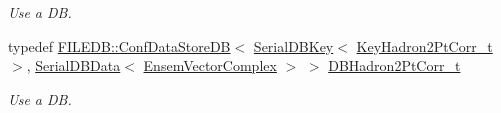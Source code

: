 \begin{DoxyCompactItemize}
\begin{DoxyCompactList}\small\item\em Use a DB. \end{DoxyCompactList}\item 
typedef \mbox{\hyperlink{classFILEDB_1_1ConfDataStoreDB}{F\+I\+L\+E\+D\+B\+::\+Conf\+Data\+Store\+DB}}$<$ \mbox{\hyperlink{classADATIO_1_1SerialDBKey}{Serial\+D\+B\+Key}}$<$ \mbox{\hyperlink{structFF_1_1KeyHadron2PtCorr__t}{Key\+Hadron2\+Pt\+Corr\+\_\+t}} $>$, \mbox{\hyperlink{classADATIO_1_1SerialDBData}{Serial\+D\+B\+Data}}$<$ \mbox{\hyperlink{group__defs_ga13b984332760feb8bc9c8f1071ade9ef}{Ensem\+Vector\+Complex}} $>$ $>$ \mbox{\hyperlink{namespaceFF_a01cd8ed6e36964833ba6609588a44ad0}{D\+B\+Hadron2\+Pt\+Corr\+\_\+t}}
\begin{DoxyCompactList}\small\item\em Use a DB. \end{DoxyCompactList}\end{DoxyCompactItemize}

